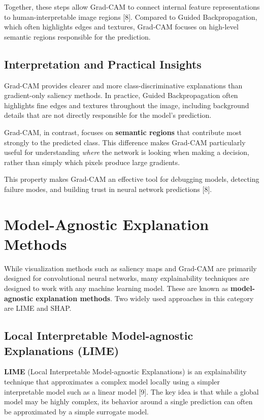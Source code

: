 \documentclass{article}
\renewcommand{\cite}[1]{[#1]}
\begin{document}
Together, these steps allow Grad-CAM to connect internal feature representations to human-interpretable image regions \cite{8}. Compared to Guided Backpropagation, which
often highlights edges and textures, Grad-CAM focuses on high-level semantic
regions responsible for the prediction.

\subsection{Interpretation and Practical Insights}

Grad-CAM provides clearer and more class-discriminative explanations than
gradient-only saliency methods. In practice, Guided Backpropagation often
highlights fine edges and textures throughout the image, including background
details that are not directly responsible for the model’s prediction. 

Grad-CAM, in contrast, focuses on \textbf{semantic regions} that contribute most
strongly to the predicted class. This difference makes Grad-CAM particularly
useful for understanding \emph{where} the network is looking when making a
decision, rather than simply which pixels produce large gradients.

This property makes Grad-CAM an effective tool for debugging models, detecting failure modes, and building trust in neural network predictions \cite{8}.



\section{Model-Agnostic Explanation Methods}

While visualization methods such as saliency maps and Grad-CAM are primarily designed for convolutional neural networks, many explainability techniques are designed to work with any machine learning model. These are known as \textbf{model-agnostic explanation methods}. Two widely used approaches in this category are LIME and SHAP.

\subsection{Local Interpretable Model-agnostic Explanations (LIME)}

\textbf{LIME} (Local Interpretable Model-agnostic Explanations) is an explainability technique that approximates a complex model locally using a simpler interpretable model such as a linear model \cite{9}. The key idea is that while a global model may be highly complex, its behavior around a single prediction can often be approximated by a simple surrogate model.
\end{document}
